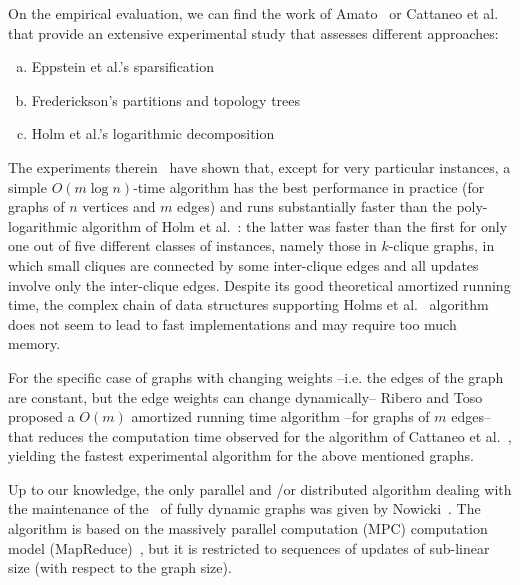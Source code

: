 On the empirical evaluation, we can find the work of Amato~\cite{Amato1997} or
Cattaneo et al.~\cite{cattaneo2010} that provide an extensive experimental study
that assesses different approaches: 

\begin{enumerate}[a)]
    \item Eppstein et al.'s sparsification~\cite{eppstein1997sparsification,eppstein1998separator,eppstein1992maintenance}
    \item Frederickson's partitions and topology trees~\cite{Frederickson1985,frederickson1997ambivalent}
    \item Holm et al.'s logarithmic decomposition~\cite{holmetal2015}
\end{enumerate}

The experiments therein~\cite{cattaneo2010} have shown that, except for very 
particular instances, a simple $O(m \log n)$-time algorithm has the best 
performance in practice (for graphs of $n$ vertices and $m$ edges) and
runs substantially faster than the poly-logarithmic algorithm of Holm et al.~\cite{holmetal2015}: 
the latter was faster than the first for only one out of five different
classes of instances, namely those in $k$-clique graphs, in which small cliques are
connected by some inter-clique edges and all updates involve only the inter-clique edges. 
Despite its good theoretical amortized running time, the complex chain of data structures 
supporting Holms et al.~\cite{holmetal2015} algorithm does not seem to lead to fast implementations 
and may require too much memory. 

For the specific case of graphs with changing weights --i.e. the edges of the graph are
constant, but the edge weights can change dynamically--  Ribero and 
Toso~\cite{Ribeiro2007} proposed a $O(m)$ amortized running time algorithm 
--for graphs of $m$ edges-- that reduces the computation time observed for the 
algorithm of Cattaneo et al.~\cite{cattaneo2010}, yielding the fastest experimental
algorithm for the above mentioned graphs.

Up to our knowledge, the only parallel and /or distributed algorithm dealing with the 
maintenance of the \mst\ of fully dynamic graphs was given by Nowicki~\cite{nowicki2021dynamic}. 
The algorithm is based on the massively parallel computation (MPC) computation model 
(MapReduce)~\cite{Karloff2010}, but it is restricted to sequences of updates of 
sub-linear size (with respect to the graph size).

